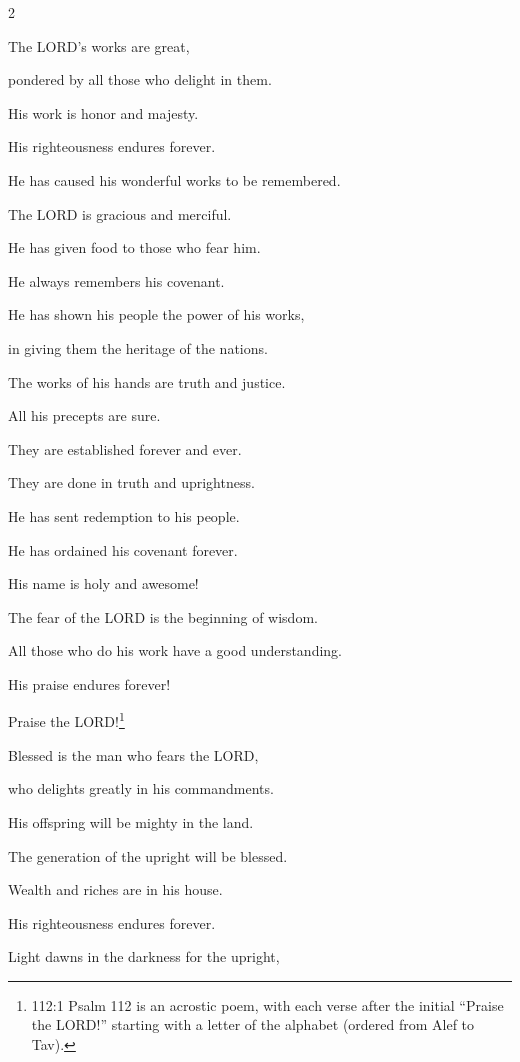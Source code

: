 \begin{multicols}{2}
	
	\myverse{}The LORD’s works are great,
	
	pondered by all those who delight in them.
	
	
	\myverse{}His work is honor and majesty.
	
	His righteousness endures forever.
	
	
	\myverse{}He has caused his wonderful works to be remembered.
	
	The LORD is gracious and merciful.
	
	
	\myverse{}He has given food to those who fear him.
	
	He always remembers his covenant.
	
	
	\myverse{}He has shown his people the power of his works,
	
	in giving them the heritage of the nations.
	
	
	\myverse{}The works of his hands are truth and justice.
	
	All his precepts are sure.
	
	
	\myverse{}They are established forever and ever.
	
	They are done in truth and uprightness.
	
	
	\myverse{}He has sent redemption to his people.
	
	He has ordained his covenant forever.
	
	His name is holy and awesome!
	
	
	\myverse{}The fear of the LORD is the beginning of wisdom.
	
	All those who do his work have a good understanding.
	
	His praise endures forever!
	
	
	\mychapter{} \myverse*{}Praise the LORD!\footnote{112:1 Psalm 112 is an acrostic poem, with each verse after the initial “Praise the LORD!” starting
		with a letter of the alphabet (ordered from Alef to Tav).}
	
	\quad\quad\quad Blessed is the man who fears the LORD,
	
	who delights greatly in his commandments.
	
	
	\myverse{}His offspring will be mighty in the land.
	
	The generation of the upright will be blessed.
	
	
	\myverse{}Wealth and riches are in his house.
	
	His righteousness endures forever.
	
	
	\myverse{}Light dawns in the darkness for the upright,
	

\end{multicols}
